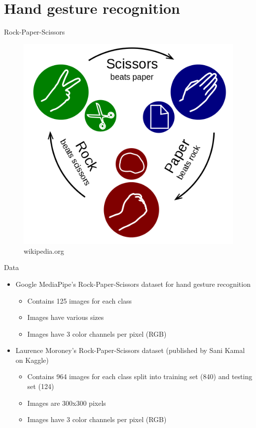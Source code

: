
\section{Hand gesture recognition}

\begin{frame}{Rock-Paper-Scissors}
  \begin{figure}
	\includegraphics[width=\linewidth,height=0.75\textheight,keepaspectratio]{images/502px-Rock-paper-scissors.svg.png}
	\caption{wikipedia.org}
  \end{figure}
\end{frame}

\begin{frame}{Data}
  \begin{itemize}
	\item Google MediaPipe's Rock-Paper-Scissors dataset for hand gesture
	recognition
	  \begin{itemize}
		\item Contains 125 images for each class
		\item Images have various sizes
		\item Images have 3 color channels per pixel (RGB)
	  \end{itemize}
	\item Laurence Moroney's Rock-Paper-Scissors dataset (published by Sani
	Kamal on Kaggle)
	  \begin{itemize}
		\item Contains 964 images for each class split into training set (840) and testing set (124)
		\item Images are 300x300 pixels
		\item Images have 3 color channels per pixel (RGB)
	  \end{itemize}
  \end{itemize}
\end{frame}

